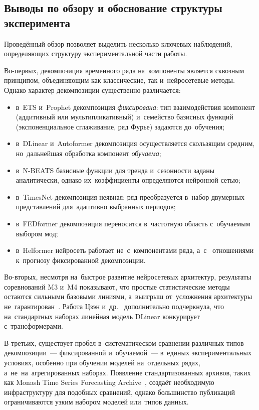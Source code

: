 \subsection{Выводы по обзору и обоснование структуры эксперимента}
\label{subsec:review-conclusions}

Проведённый обзор позволяет выделить несколько ключевых наблюдений,
определяющих структуру экспериментальной части работы.

Во-первых, декомпозиция временного ряда на~компоненты является
сквозным принципом, объединяющим как классические, так и~нейросетевые
методы.  Однако характер декомпозиции существенно различается:
\begin{itemize}[nosep]
\item в~ETS и~Prophet декомпозиция \textit{фиксирована}: тип
   взаимодействия компонент (аддитивный или мультипликативный)
   и~семейство базисных функций (экспоненциальное сглаживание, ряд
   Фурье) задаются до~обучения;
\item в~DLinear и~Autoformer декомпозиция осуществляется скользящим
   средним, но~дальнейшая обработка компонент \textit{обучаема};
\item в~N-BEATS базисные функции для тренда и~сезонности заданы
   аналитически, однако их~коэффициенты определяются нейронной сетью;
\item в~TimesNet декомпозиция неявная: ряд преобразуется в~набор
   двумерных представлений для~адаптивно выбранных периодов;
\item в~FEDformer декомпозиция переносится в~частотную область
   с~обучаемым выбором мод;
\item в~Helformer нейросеть работает не~с~компонентами ряда, а~с~
   отношениями к~прогнозу фиксированной декомпозиции.
\end{itemize}

Во-вторых, несмотря на~быстрое развитие нейросетевых архитектур,
результаты соревнований M3 и~M4 показывают, что простые статистические
методы остаются сильными базовыми линиями, а~выигрыш от~усложнения
архитектуры не~гарантирован~\cite{makridakis2000m3, makridakis2020m4}.
Работа Цзэн и~др.~\cite{zeng2023transformers} дополнительно подчеркнула,
что на~стандартных наборах линейная модель DLinear конкурирует
с~трансформерами.

В-третьих, существует пробел в~систематическом сравнении различных
типов декомпозиции~--- фиксированной и~обучаемой~--- в~единых
экспериментальных условиях, особенно при обучении моделей на~отдельных
рядах, а~не~на~агрегированных наборах.  Появление стандартизованных
архивов, таких как Monash Time Series Forecasting
Archive~\cite{godahewa2021monash}, создаёт необходимую инфраструктуру
для подобных сравнений, однако большинство публикаций ограничиваются
узким набором моделей или~типов данных.


